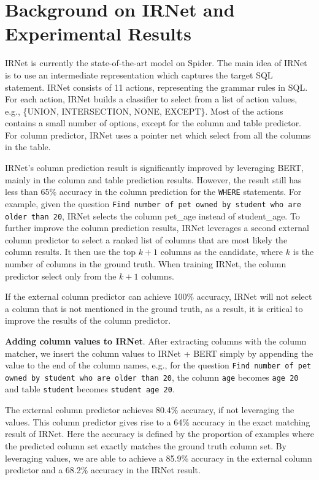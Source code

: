 
\section{Background on IRNet and Experimental Results}
\label{sec:exp}

IRNet is currently the state-of-the-art model on Spider. The main idea of IRNet is to use an intermediate representation which captures the target SQL statement. IRNet consists of 11 actions, representing the grammar rules in SQL. For each action, IRNet builds a classifier to select from a list of action values, e.g., \{UNION, INTERSECTION, NONE, EXCEPT\}. Most of the actions contains a small number of options, except for the column and table predictor. For column predictor, IRNet uses a pointer net which select from all the columns in the table. 

IRNet's column prediction result is significantly improved by leveraging BERT, mainly in the column and table prediction results. However, the result still has less than 65\% accuracy in the column prediction for the \texttt{WHERE} statements. For example, given the question \texttt{Find number of pet owned by student who are older than 20}, IRNet selects the column pet\_age instead of student\_age. To further improve the column prediction results, IRNet leverages a second external column predictor to select a ranked list of columns that are most likely the column results. It then use the top $k+1$ columns as the candidate, where $k$ is the number of columns in the ground truth. When training IRNet, the column predictor select only from the $k + 1$ columns. 

If the external column predictor can achieve 100\% accuracy, IRNet will not select a column that is not mentioned in the ground truth, as a result, it is critical to improve the results of the column predictor. 

\textbf{Adding column values to IRNet}. After extracting columns with the column matcher, we insert the column values to IRNet + BERT simply by appending the value to the end of the column names, e.g., for the question \texttt{Find number of pet owned by student who are older than 20}, the column \texttt{age} becomes \texttt{age 20} and table \texttt{student} becomes \texttt{student age 20}. 

The external column predictor achieves 80.4\% accuracy, if not leveraging the values. This column predictor gives rise to a 64\% accuracy in the exact matching result of IRNet. Here the accuracy is defined by the proportion of examples where the predicted column set exactly matches the ground truth column set. By leveraging values, we are able to achieve a 85.9\% accuracy in the external column predictor and a 68.2\% accuracy in the IRNet result. 

